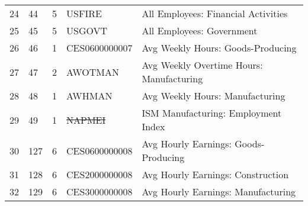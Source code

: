 \begin{table}[ht]
\begin{tabular}{lllll}
24 & 44 & 5 & USFIRE & All Employees: Financial Activities \\
25 & 45 & 5 & USGOVT & All Employees: Government \\
26 & 46 & 1 & CES0600000007 & Avg Weekly Hours: Goods-Producing \\
27 & 47 & 2 & AWOTMAN & Avg Weekly Overtime Hours: Manufacturing \\
28 & 48 & 1 & AWHMAN & Avg Weekly Hours: Manufacturing \\
29 & 49 & 1 & \sout{NAPMEI} & ISM Manufacturing: Employment Index \\
30 & 127 & 6 & CES0600000008 & Avg Hourly Earnings: Goods-Producing \\
31 & 128 & 6 & CES2000000008 & Avg Hourly Earnings: Construction \\
32 & 129 & 6 & CES3000000008 & Avg Hourly Earnings: Manufacturing \\

\bottomrule
\end{tabular}  
\end{table} 